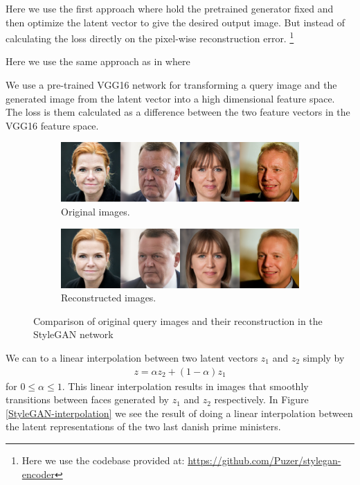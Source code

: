 Here we use the first approach where hold the pretrained generator fixed and then optimize the latent vector to give the desired output image. But instead of calculating the loss directly on the pixel-wise reconstruction error. \footnote{Here we use the codebase provided at: \url{https://github.com/Puzer/stylegan-encoder}}



Here we use the same approach as in \cite{styletransfer} where

We use a pre-trained VGG16 network for transforming a query image and the generated image from the latent vector into a high dimensional feature space. The loss is them calculated as a difference between the two feature vectors in the VGG16 feature space.

\begin{figure}
    \centering
    \begin{subfigure}[b]{\textwidth}
        \includegraphics[width=\textwidth]{fig/stylegan/originals}
        \caption{Original images.}
    \end{subfigure}
    \begin{subfigure}[b]{\textwidth}
        \includegraphics[width=\textwidth]{fig/stylegan/reconstructions}
        \caption{Reconstructed images.}
    \end{subfigure}
    \caption{Comparison of original query images and their reconstruction in the StyleGAN network}
    \label{stylegan-reconstruction}
\end{figure}


We can to a linear interpolation between two latent vectors $z_1$ and $z_2$ simply by
\begin{align}
  z = \alpha z_2 + (1-\alpha)z_1
\end{align}
for $0 \leq \alpha \leq 1$. This linear interpolation results in images that smoothly transitions between faces generated by $z_1$ and $z_2$ respectively. In Figure \ref{StyleGAN-interpolation} we see the result of doing a linear interpolation between the latent representations of the two last danish prime ministers.

